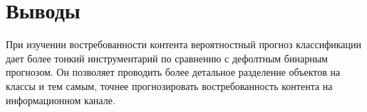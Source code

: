 \section{Выводы}
При изучении востребованности контента вероятностный прогноз классификации дает  более тонкий инструментарий по сравнению с дефолтным бинарным прогнозом. Он позволяет проводить более детальное разделение объектов на классы и тем самым, точнее прогнозировать востребованность контента на информационном канале.
